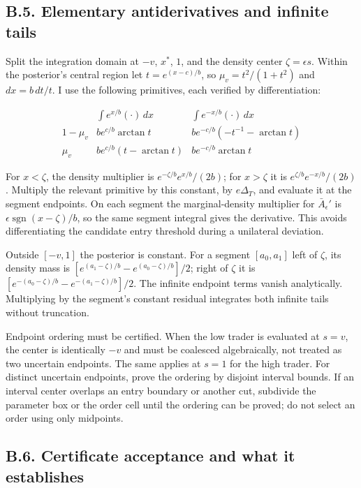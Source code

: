 \documentclass[
  11pt,
]{article}
\begin{document}
\subsection{B.5. Elementary antiderivatives and infinite
tails}\label{oa-b-integrals}

Split the integration domain at \(-v\), \(x^*\), \(1\), and the density
center \(\zeta=\epsilon s\). Within the posterior's central region let
\(t=e^{(x-c)/b}\), so \(\mu_v=t^2/(1+t^2)\) and \(dx=b\,dt/t\). I use
the following primitives, each verified by differentiation:

\[
\begin{array}{c|cc}
&\displaystyle\int e^{x/b}(\cdot)\,dx&\displaystyle\int e^{-x/b}(\cdot)\,dx\\[2pt]
1-\mu_v&b e^{c/b}\arctan t&b e^{-c/b}(-t^{-1}-\arctan t)\\[2pt]
\mu_v&b e^{c/b}(t-\arctan t)&b e^{-c/b}\arctan t
\end{array}
\tag{OA.74}\label{eq:oa-oa-74}
\]

For \(x<\zeta\), the density multiplier is \(e^{-\zeta/b}e^{x/b}/(2b)\);
for \(x>\zeta\) it is \(e^{\zeta/b}e^{-x/b}/(2b)\). Multiply the
relevant primitive by this constant, by \(e\Delta_T\), and evaluate it
at the segment endpoints. On each segment the marginal-density
multiplier for \(\bar A_\epsilon'\) is
\(\epsilon\operatorname{sgn}(x-\zeta)/b\), so the same segment integral
gives the derivative. This avoids differentiating the candidate entry
threshold during a unilateral deviation.

Outside \([-v,1]\) the posterior is constant. For a segment
\([a_0,a_1]\) left of \(\zeta\), its density mass is
\([e^{(a_1-\zeta)/b}-e^{(a_0-\zeta)/b}]/2\); right of \(\zeta\) it is
\([e^{-(a_0-\zeta)/b}-e^{-(a_1-\zeta)/b}]/2\). The infinite endpoint
terms vanish analytically. Multiplying by the segment's constant
residual integrates both infinite tails without truncation.

Endpoint ordering must be certified. When the low trader is evaluated at
\(s=v\), the center is identically \(-v\) and must be coalesced
algebraically, not treated as two uncertain endpoints. The same applies
at \(s=1\) for the high trader. For distinct uncertain endpoints, prove
the ordering by disjoint interval bounds. If an interval center overlaps
an entry boundary or another cut, subdivide the parameter box or the
order cell until the ordering can be proved; do not select an order
using only midpoints.

\subsection{B.6. Certificate acceptance and what it
establishes}\label{oa-b-acceptance}
\end{document}
